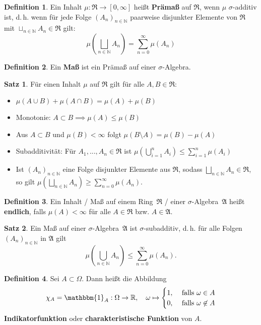 \documentclass[a4paper,10pt,landscape]{article}
\newcommand{\R}{\mathbb{R}}
\newcommand{\N}{\mathbb{N}}
\newcommand{\Alg}{\mathfrak{A}}
\newcommand{\Ring}{\mathfrak{R}}
\theoremstyle{definition}
\newtheorem*{defn}{Definition}
\newtheorem*{satz}{Satz}
\theoremstyle{remark}
\renewcommand{\emph}[1]{\textcolor{Emph}{\bf{#1}}}
\begin{document}
\begin{multicols}{3}
\begin{defn}
  Ein Inhalt $\mu : \Ring \to [0, \infty]$ heißt \emph{Prämaß} auf $\Ring$, wenn $\mu$ $\sigma$-additiv ist, d.\,h. wenn für jede Folge $(A_n)_{n \in \N}$ paarweise disjunkter Elemente von $\Ring$ mit $\sqcup_{n \in \N} A_n \in \Ring$ gilt:
  \[ \mu\left(\bigsqcup_{n \in \N} A_n\right) = \sum_{n=0}^\infty \mu(A_n) \]
\end{defn}

\begin{defn}
  Ein \emph{Maß} ist ein Prämaß auf einer $\sigma$-Algebra.
\end{defn}

\begin{satz}
  Für einen Inhalt $\mu$ auf $\Ring$ gilt für alle $A, B \in \Ring$:
  \begin{itemize}
    \item $\mu(A \cup B) + \mu(A \cap B) = \mu(A) + \mu(B)$
    \item Monotonie: $A \subset B \implies \mu(A) \leq \mu(B)$
    \item Aus $A \subset B$ und $\mu(B) < \infty$ folgt $\mu(B \setminus A) = \mu(B) - \mu(A)$
    \item Subadditivität: Für $A_1, ..., A_n \in \Ring$ ist $\mu\left(\bigcup_{i = 1}^n A_i \right) \leq \sum_{i = 1}^n \mu(A_i)$
    \item Ist $(A_n)_{n \in \N}$ eine Folge disjunkter Elemente aus $\Ring$, sodass $\bigsqcup_{n \in \N} A_n \in \Ring$, so gilt $\mu(\bigsqcup_{n \in \N} A_n) \geq \sum_{n=0}^\infty \mu(A_n)$.
  \end{itemize}
\end{satz}

\begin{defn}
  Ein Inhalt / Maß auf einem Ring~$\Ring$ / einer $\sigma$-Algebra~$\Alg$ heißt \emph{endlich}, falls $\mu(A) < \infty$ für alle $A \in \Ring$ bzw. $A \in \Alg$.
\end{defn}

\begin{satz}
  Ein Maß auf einer $\sigma$-Algebra~$\Alg$ ist $\sigma$-subadditiv, d.\,h. für alle Folgen $(A_n)_{n \in \N}$ in $\Alg$ gilt
  \[ \mu(\bigcup_{n \in \N} A_n) \leq \sum_{n=0}^\infty \mu(A_n). \]
\end{satz}

\begin{defn}
  Sei $A \subset \Omega$. Dann heißt die Abbildung
  \[ \chi_A = \mathbbm{1}_A : \Omega \to \R, \quad \omega \mapsto \begin{cases} 1, & \text{ falls } \omega \in A \\ 0, & \text{ falls } \omega \not\in A \end{cases} \]
  \emph{Indikatorfunktion} oder \emph{charakteristische Funktion} von $A$.
\end{defn}


\end{multicols}
\end{document}
